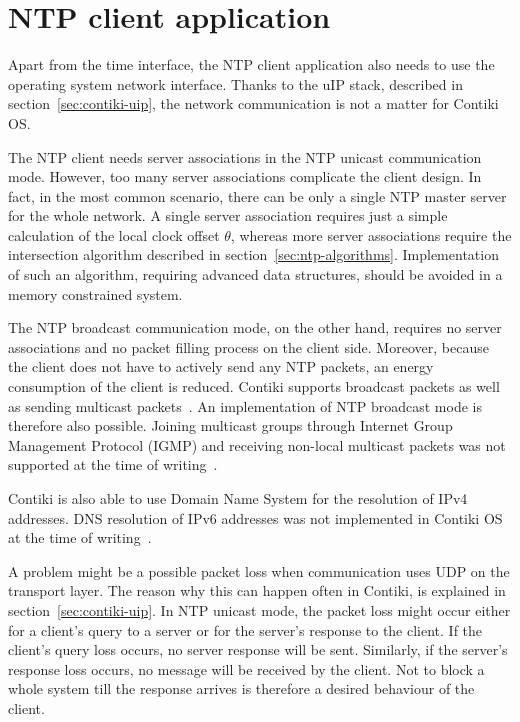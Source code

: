 
\section{NTP client application}
Apart from the time interface, the NTP client application
also needs to use the operating system network interface.
Thanks to the uIP stack, described in section~\ref{sec:contiki-uip},
the network communication is not a matter for Contiki OS.

The NTP client needs server associations in the NTP unicast communication mode.
However, too many server associations complicate the client design.
In fact, in the most common scenario, there can be only a single NTP master server
for the whole network.
A single server association requires just a simple calculation of the local clock offset
$\theta$, whereas more server associations require the intersection algorithm
described in section~\ref{sec:ntp-algorithms}.
Implementation of such an algorithm, requiring advanced data structures, should be avoided
in a memory constrained system.

The NTP broadcast communication mode, on the other hand,
requires no server associations and no packet filling process on the client side.
Moreover, because the client does not have to actively send any NTP packets,
an energy consumption of the client is reduced.
Contiki supports broadcast packets as well as sending multicast packets~\cite{contiki-docs}.
An implementation of NTP broadcast mode is therefore also possible.
Joining multicast groups through Internet Group Management Protocol (IGMP)
and receiving non-local multicast packets
was not supported at the time of writing~\cite{contiki-docs}.

Contiki is also able to use Domain Name System for the resolution of IPv4 addresses.
DNS resolution of IPv6 addresses was not implemented in Contiki OS
at the time of writing~\cite{contiki-docs}.

A problem might be a possible packet loss when communication uses UDP on the transport layer.
The reason why this can happen often in Contiki, is explained in section~\ref{sec:contiki-uip}.
In NTP unicast mode, the packet loss might occur either for a client's query to a server
or for the server's response to the client.
If the client's query loss occurs, no server response will be sent.
Similarly, if the server's response loss occurs, no message will be received by the client.
Not to block a whole system till the response arrives
is therefore a desired behaviour of the client.

